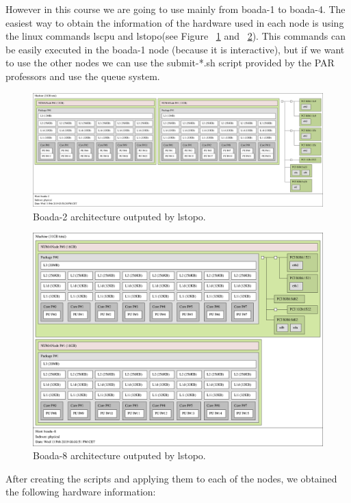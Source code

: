 \documentclass[12]{article}
\begin{document}
However in this course we are going to use mainly from boada-1 to boada-4. The easiest way to obtain the information of the hardware used in each node is using the linux commands lscpu and lstopo(see Figure  ~\ref{fig:lstopto2} and ~\ref{fig:lstopto8}). This commands can be easily executed in the boada-1 node (because it is interactive), but if we want to use the other nodes we can use the submit-*.sh script provided by the PAR professors and use the queue system. \\
\medskip

\begin{figure}[h]
\centering  \includegraphics[width=.8\linewidth]{images/map-2.png}
  \caption{Boada-2 architecture outputed by lstopo.}
  \label{fig:lstopto2}
\end{figure}

\begin{figure}[h]
\centering
  \includegraphics[width=.8\linewidth]{images/map-8.png}
  \caption{Boada-8 architecture outputed by lstopo.}
  \label{fig:lstopto8}
\end{figure}

After creating the scripts and applying them to each of the nodes, we obtained the following hardware information: 
\end{document}
